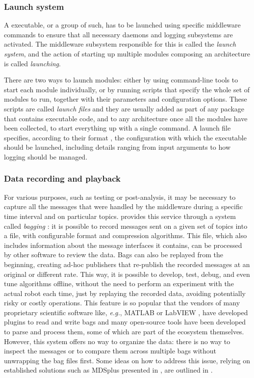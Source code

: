 \subsubsection{Launch system}
\label{sec:ros2_launch}
A \ROS executable, or a group of such, has to be launched using specific middleware commands to ensure that all necessary daemons and logging subsystems are activated. The middleware subsystem responsible for this is called the \emph{launch system}, and the action of starting up multiple modules composing an architecture is called \emph{launching}.

There are two ways to launch modules: either by using command-line tools to start each module individually, or by running scripts that specify the whole set of modules to run, together with their parameters and configuration options. These scripts are called \emph{launch files} and they are usually added as part of any package that contains executable code, and to any architecture once all the modules have been collected, to start everything up with a single command. A launch file specifies, according to their format \cite{open_robotics_launch_nodate}, the configuration with which the executable should be launched, including details ranging from input arguments to how logging should be managed.

\subsubsection{Data recording and playback}
\label{sec:ros2_bags}
For various purposes, such as testing or post-analysis, it may be necessary to capture all the messages that were handled by the middleware during a specific time interval and on particular topics. \ROS provides this service through a system called \emph{bagging} \cite{open_robotics_recording_nodate}: it is possible to record messages sent on a given set of topics into a file, with configurable format and compression algorithms. This file, which also includes information about the message interfaces it contains, can be processed by other software to review the data. Bags can also be replayed from the beginning, creating ad-hoc publishers that re-publish the recorded messages at an original or different rate. This way, it is possible to develop, test, debug, and even tune algorithms offline, without the need to perform an experiment with the actual robot each time, just by replaying the recorded data, avoiding potentially risky or costly operations. This feature is so popular that the vendors of many proprietary scientific software like, \emph{e.g.}, MATLAB \cite{mathworks_matlab_nodate} or LabVIEW \cite{national_instruments_labview_nodate}, have developed plugins to read and write \ROS bags and many open-source tools have been developed to parse and process them, some of which are part of the \ROS ecosystem themselves. However, this system offers no way to organize the data: there is no way to inspect the messages or to compare them across multiple bags without unwrapping the bag files first. Some ideas on how to address this issue, relying on established solutions such as MDSplus presented in , are outlined in .

